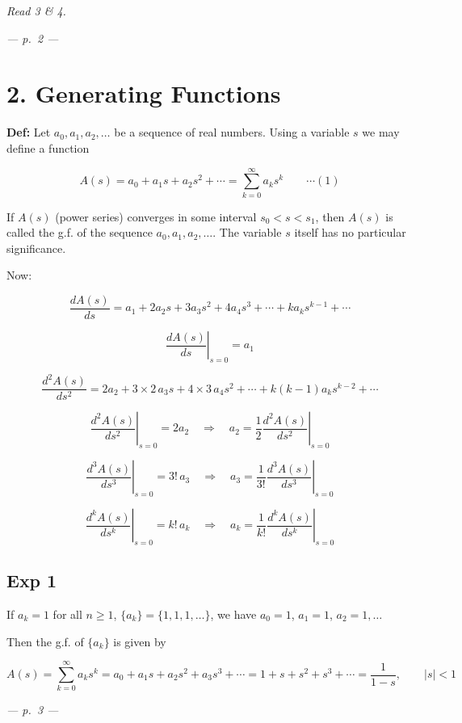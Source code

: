 \documentclass[
]{article}
\begin{document}
\emph{Read 3 \& 4.}

\emph{--- p.~2 ---}

\section{2. Generating Functions}\label{generating-functions}

\textbf{Def:} Let \(a_0, a_1, a_2, \ldots\) be a sequence of real
numbers. Using a variable \(s\) we may define a function

\[A(s) = a_0 + a_1 s + a_2 s^2 + \cdots = \sum_{k=0}^{\infty} a_k s^k \qquad \cdots (1)\]

If \(A(s)\) (power series) converges in some interval \(s_0 < s < s_1\),
then \(A(s)\) is called the g.f. of the sequence
\(a_0, a_1, a_2, \ldots\). The variable \(s\) itself has no particular
significance.

Now:

\[\frac{dA(s)}{ds} = a_1 + 2a_2 s + 3a_3 s^2 + 4a_4 s^3 + \cdots + k a_k s^{k-1} + \cdots\]

\[\left. \frac{dA(s)}{ds} \right|_{s=0} = a_1\]

\[\frac{d^2 A(s)}{ds^2} = 2a_2 + 3 \times 2\, a_3 s + 4 \times 3\, a_4 s^2 + \cdots + k(k-1) a_k s^{k-2} + \cdots\]

\[\left. \frac{d^2 A(s)}{ds^2} \right|_{s=0} = 2a_2 \quad \Rightarrow \quad a_2 = \frac{1}{2} \left. \frac{d^2 A(s)}{ds^2} \right|_{s=0}\]

\[\left. \frac{d^3 A(s)}{ds^3} \right|_{s=0} = 3!\, a_3 \quad \Rightarrow \quad a_3 = \frac{1}{3!} \left. \frac{d^3 A(s)}{ds^3} \right|_{s=0}\]

\[\left. \frac{d^k A(s)}{ds^k} \right|_{s=0} = k!\, a_k \quad \Rightarrow \quad a_k = \frac{1}{k!} \left. \frac{d^k A(s)}{ds^k} \right|_{s=0}\]

\subsection{Exp 1}\label{exp-1}

If \(a_k = 1\) for all \(n \ge 1\), \(\{a_k\} = \{1, 1, 1, \ldots\}\),
we have \(a_0 = 1\), \(a_1 = 1\), \(a_2 = 1, \ldots\)

Then the g.f. of \(\{a_k\}\) is given by

\[A(s) = \sum_{k=0}^{\infty} a_k s^k = a_0 + a_1 s + a_2 s^2 + a_3 s^3 + \cdots = 1 + s + s^2 + s^3 + \cdots = \frac{1}{1-s}, \qquad |s| < 1\]

\emph{--- p.~3 ---}
\end{document}
